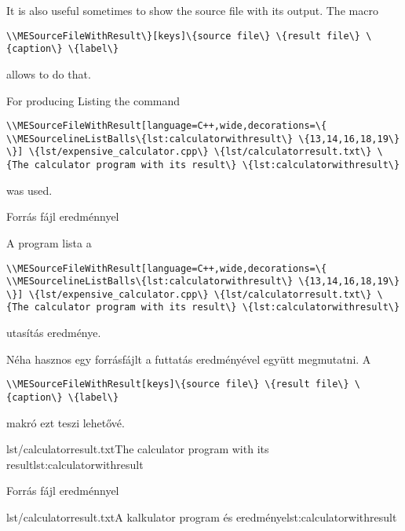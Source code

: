 {
It is also useful sometimes to show the source file with its output.
The macro 
\par\noindent\lstinline|\\MESourceFileWithResult\}[keys]\{source file\} \{result file\} \{caption\} \{label\}|
\par\noindent allows to do that. 

 For producing Listing \ao{\ref{lst:calculatorwithresult}}
the command 
\par\noindent\lstinline|\\MESourceFileWithResult[language=C++,wide,decorations=\{
	\\MESourcelineListBalls\{lst:calculatorwithresult\} \{13,14,16,18,19\}
\}] \{lst/expensive_calculator.cpp\}
\{lst/calculatorresult.txt\} \{The calculator program with its result\} \{lst:calculatorwithresult\}|
\par\noindent was used.
}
{Forrás fájl eredménnyel}
{
A \ao{\ref{lst:calculatorwithresult}} program lista
a 
\par\noindent\lstinline|\\MESourceFileWithResult[language=C++,wide,decorations=\{
	\\MESourcelineListBalls\{lst:calculatorwithresult\} \{13,14,16,18,19\}
\}] \{lst/expensive_calculator.cpp\}
\{lst/calculatorresult.txt\} \{The calculator program with its result\} \{lst:calculatorwithresult\}|
\par\noindent utasítás eredménye.

Néha hasznos egy forrásfájlt a futtatás eredményével együtt megmutatni.
A
\par\noindent\lstinline|\\MESourceFileWithResult[keys]\{source file\} \{result file\} \{caption\} \{label\}|
\par\noindent makró ezt teszi lehetővé.
}

{

{lst/calculatorresult.txt}{The calculator program with its result}{lst:calculatorwithresult}

}
{Forrás fájl eredménnyel}
{

{lst/calculatorresult.txt}{A kalkulator program és eredménye}{lst:calculatorwithresult}
}

